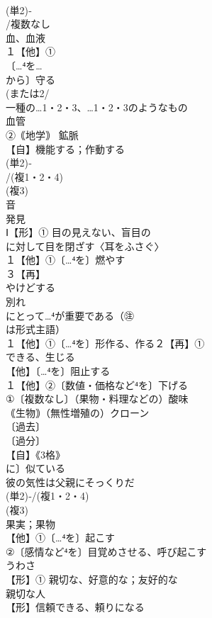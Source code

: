 \documentclass[8pt]{extreport}
\begin{document}
\begin{CJK}{UTF8}{min}
\\	(単2)‐
\\	/複数なし 
\\	血、血液
\\	１【他】①
\\	〔…⁴を…
\\	から〕守る 
\\	(または2/
\\	一種の…1・2・3、…1・2・3のようなもの
\\	血管 
\\	②｟地学｠ 鉱脈
\\	【自】機能する；作動する
\\	(単2)‐
\\	/(複1・2・4)
\\	(複3)
\\	音 
\\	発見 
\\	Ⅰ【形】① 目の見えない、盲目の
\\	に対して目を閉ざす〈耳をふさぐ〉
\\	１【他】①〔…⁴を〕燃やす 
\\	３【再】
\\	やけどする
\\	別れ
\\	にとって…⁴が重要である（㊟
\\	は形式主語）
\\	１【他】①〔…⁴を〕形作る、作る２【再】①
\\	できる、生じる
\\	【他】〔…⁴を〕阻止する
\\	１【他】②〔数値・価格など⁴を〕下げる
\\	①〔複数なし〕（果物・料理などの）酸味
\\	｟生物｠（無性増殖の）クローン 
\\	〔過去〕
\\	〔過分〕
\\	【自】《3格》
\\	に〕似ている 
\\	彼の気性は父親にそっくりだ
\\	(単2)‐/(複1・2・4)
\\	(複3)
\\	果実；果物
\\	【他】①〔…⁴を〕起こす
\\	②〔感情など⁴を〕目覚めさせる、呼び起こす
\\	うわさ 
\\	【形】① 親切な、好意的な；友好的な
\\	親切な人
\\	【形】信頼できる、頼りになる

\end{CJK}
\end{document}
